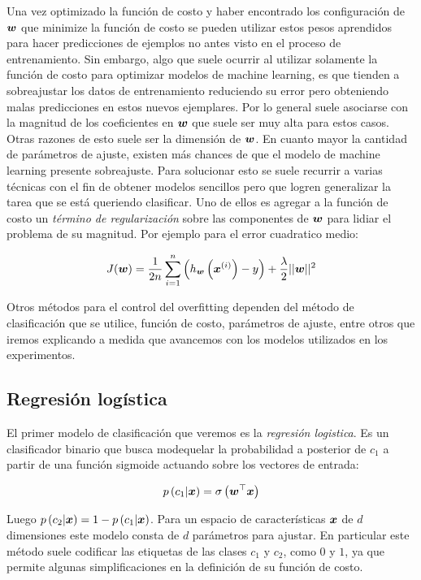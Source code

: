 Una vez optimizado la función de costo y haber encontrado los configuración de
$\boldsymbol{w}$ que minimize la función de costo se pueden utilizar estos pesos
aprendidos para hacer predicciones de ejemplos no antes visto en el proceso de
entrenamiento. Sin embargo, algo que suele ocurrir al utilizar solamente la
función de costo para optimizar modelos de machine learning, es que tienden a
sobreajustar los datos de entrenamiento reduciendo su error pero obteniendo
malas predicciones en estos nuevos ejemplares. Por lo general suele asociarse
con la magnitud de los coeficientes en $\boldsymbol{w}$ que suele ser muy alta para
estos casos. Otras razones de esto suele ser la dimensión de $\boldsymbol{w}$. En
cuanto mayor la cantidad de parámetros de ajuste, existen más chances de que el
modelo de machine learning presente sobreajuste. Para solucionar esto se suele
recurrir a varias técnicas con el fin de obtener modelos sencillos pero que
logren generalizar la tarea que se está queriendo clasificar. Uno de ellos es
agregar a la función de costo un \emph{término de regularización} sobre las
componentes de $\boldsymbol{w}$ para lidiar el problema de su magnitud. Por ejemplo para
el error cuadratico medio:

\begin{align*}
    J(\boldsymbol{w}) = \frac{1}{2n} \sum_{i=1}^{n}\left( h_{\boldsymbol{w}}\left( \boldsymbol{x}^{(i)}\right) - y \right) +
                  \frac{\lambda}{2} ||\boldsymbol{w}||^{2}
\end{align*}

Otros métodos para el control del overfitting dependen del método de
clasificación que se utilice, función de costo, parámetros de ajuste, entre
otros que iremos explicando a medida que avancemos con los modelos utilizados en
los experimentos.

\subsection{Regresión logística}

El primer modelo de clasificación que veremos es la \emph{regresión logistica}. Es un
clasificador binario que busca modequelar la probabilidad a posterior de $c_1$ a
partir de una función sigmoide actuando sobre los vectores de
entrada:

\begin{align*}
    p\left( c_1 | \boldsymbol{x} \right) = \sigma\left( \boldsymbol{w}^{\top} \boldsymbol{x} \right)
\end{align*}

Luego $p\left( c_2 | \boldsymbol{x} \right) = 1 - p\left( c_1 | \boldsymbol{x} \right)$.
Para un espacio de características $\boldsymbol{x}$ de $d$ dimensiones este modelo
consta de $d$ parámetros para ajustar. En particular este método suele codificar
las etiquetas de las clases $c_1$ y $c_2$, como $0$ y $1$, ya que permite
algunas simplificaciones en la definición de su función de costo.

